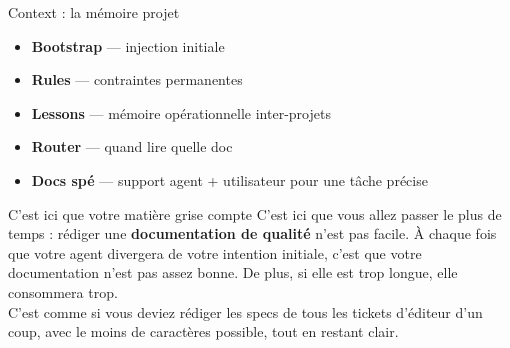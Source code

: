 \documentclass[aspectratio=169]{beamer}
\begin{document}
\begin{frame}{Context : la mémoire projet}
    \begin{itemize}
        \item \textbf{Bootstrap} --- injection initiale 
        \item \textbf{Rules} --- contraintes permanentes 
        \item \textbf{Lessons} --- mémoire opérationnelle inter-projets
        \item \textbf{Router} --- quand lire quelle doc 
        \item \textbf{Docs spé} --- support agent + utilisateur pour une tâche précise
    \end{itemize}
    \vspace{0.4cm}
    \begin{block}{C'est ici que votre matière grise compte}
        C'est ici que vous allez passer le plus de temps : rédiger une \textbf{documentation de qualité} n'est pas facile.
        À chaque fois que votre agent divergera de votre intention initiale, c'est que votre documentation n'est pas assez bonne.
        De plus, si elle est trop longue, elle consommera trop.\\
        C'est comme si vous deviez rédiger les specs de tous les tickets d'éditeur d'un coup,
        avec le moins de caractères possible, tout en restant clair.
    \end{block}
\end{frame}
\end{document}
